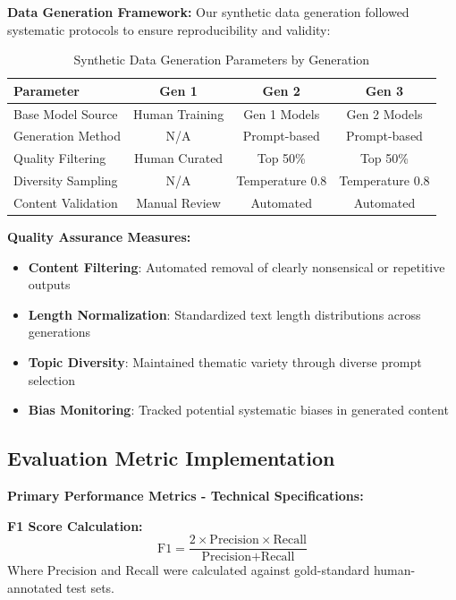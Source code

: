 \documentclass{article}
\begin{document}
\textbf{Data Generation Framework:}
Our synthetic data generation followed systematic protocols to ensure reproducibility and validity:

\begin{table}[H]
\centering
\caption{Synthetic Data Generation Parameters by Generation}
\label{tab:data_generation_params}
\begin{tabular}{lccc}
\toprule
\textbf{Parameter} & \textbf{Gen 1} & \textbf{Gen 2} & \textbf{Gen 3} \\
\midrule
Base Model Source & Human Training & Gen 1 Models & Gen 2 Models \\
Generation Method & N/A & Prompt-based & Prompt-based \\
Quality Filtering & Human Curated & Top 50\% & Top 50\% \\
Diversity Sampling & N/A & Temperature 0.8 & Temperature 0.8 \\
Content Validation & Manual Review & Automated & Automated \\
\bottomrule
\end{tabular}
\end{table}

\textbf{Quality Assurance Measures:}
\begin{itemize}
    \item \textbf{Content Filtering}: Automated removal of clearly nonsensical or repetitive outputs
    \item \textbf{Length Normalization}: Standardized text length distributions across generations
    \item \textbf{Topic Diversity}: Maintained thematic variety through diverse prompt selection
    \item \textbf{Bias Monitoring}: Tracked potential systematic biases in generated content
\end{itemize}

\subsection{Evaluation Metric Implementation}

\textbf{Primary Performance Metrics - Technical Specifications:}

\textbf{F1 Score Calculation:}
\begin{equation}
\text{F1} = \frac{2 \times \text{Precision} \times \text{Recall}}{\text{Precision} + \text{Recall}}
\end{equation}
Where $\text{Precision}$ and $\text{Recall}$ were calculated against gold-standard human-annotated test sets.
\end{document}

